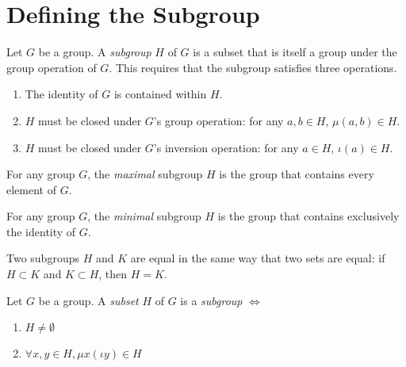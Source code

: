 \section{Defining the Subgroup}

\begin{definition}
    \label{definition : Subgroup}
    \leanok
    Let $G$ be a group. A \textit{subgroup} $H$ of $G$ is a subset that is itself a group under the group operation of $G$. This requires that the subgroup satisfies three operations.

    \begin{enumerate}
        \item The identity of $G$ is contained within $H$.
        \item $H$ must be closed under $G$'s group operation: for any $a,b \in H$, $\mu(a,b) \in H$.
        \item $H$ must be closed under $G$'s inversion operation: for any $a \in H$, $\iota(a) \in H$.
    \end{enumerate}
\end{definition}

\begin{definition}
    \label{definition : Subgroup_Maximal}
    \leanok
    For any group $G$, the \textit{maximal} subgroup $H$ is the group that contains every element of $G$.
\end{definition}

\begin{definition}
    \label{definition : Subgroup_Minimal}
    \leanok
    For any group $G$, the \textit{minimal} subgroup $H$ is the group that contains exclusively the identity of $G$.
\end{definition}

\begin{theorem}
    \label{theorem : Subgroup_ext}
    \leanok
    Two subgroups $H$ and $K$ are equal in the same way that two sets are equal: if $H \subset K$ and $K \subset H$, then $H = K$.
\end{theorem}

\begin{proposition}
    \label{proposition : Subgroup_Criterion}
    \leanok
    Let $G$ be a group. A \textit{subset} $H$ of $G$ is a \textit {subgroup} $\iff$
    \begin{enumerate}
        \item $H \neq \emptyset$
        \item $\forall x, y \in H, \mu x ( \iota y) \in H$
    \end{enumerate}
\end{proposition}

